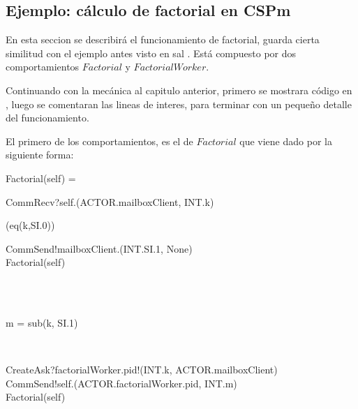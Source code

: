 \subsection{Ejemplo: cálculo de factorial en CSPm}
En esta seccion se describirá el funcionamiento de factorial, guarda cierta similitud con el ejemplo antes visto en sal \SAL. Está compuesto por dos comportamientos $Factorial$ y $FactorialWorker$.

Continuando con la mecánica al capitulo anterior, primero se mostrara código en \CSPm, luego se comentaran las lineas de interes, para terminar con un pequeño detalle del funcionamiento.

El primero de los comportamientos, es el de $Factorial$ que viene dado por la siguiente forma:
\begin{process}
Factorial(self) = {} \\ \quad
  \begin{block}
  CommRecv?self.(ACTOR.mailboxClient, INT.k) \then {} \\ \quad
    \begin{block}
    \If (eq(k,SI.0)) \Then {} \\ \quad
      \begin{block} 
      CommSend!mailboxClient.(INT.SI.1, None) \then \\
      Factorial(self) 
      \end{block} \\
    \Else {} \\ \quad
      \begin{block}
      \begin{declaration}
     m  = sub(k, SI.1) 
	\end{declaration} \\
	\begin{within}
	CreateAsk?factorialWorker.pid!(INT.k, ACTOR.mailboxClient) \then \\
	CommSend!self.(ACTOR.factorialWorker.pid, INT.m) \then \\
	Factorial(self)
	\end{within}
      \end{block}
    \end{block}
  \end{block}
\end{process}


